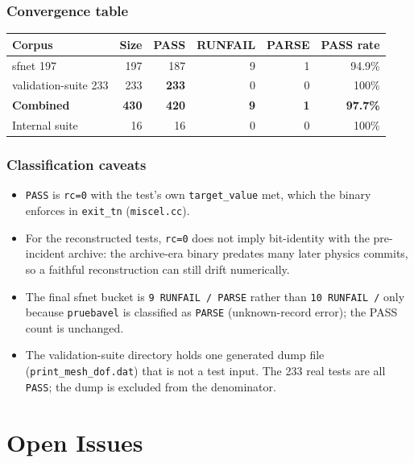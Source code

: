 \documentclass[11pt,a4paper]{report}
\newcommand{\code}[1]{\texttt{#1}}
\begin{document}
\section{Convergence table}

\begin{center}
\begin{tabular}{@{}L{4.4cm}rrrrr@{}}
\toprule
Corpus & Size & PASS & RUNFAIL & PARSE & PASS rate \\
\midrule
sfnet 197 & 197 & 187 & 9 & 1 & 94.9\% \\
validation-suite 233 & 233 & \textbf{233} & 0 & 0 & 100\% \\
\textbf{Combined} & \textbf{430} & \textbf{420} & \textbf{9} & \textbf{1} & \textbf{97.7\%} \\
Internal suite & 16 & 16 & 0 & 0 & 100\% \\
\bottomrule
\end{tabular}
\end{center}

\section{Classification caveats}

\begin{itemize}
  \item \code{PASS} is \code{rc=0} with the test's own \code{target\_\allowbreak value} met,
        which the binary enforces in \code{exit\_\allowbreak tn} (\code{miscel.cc}).
  \item For the reconstructed tests, \code{rc=0} does not imply bit-identity with
        the pre-incident archive: the archive-era binary predates many later
        physics commits, so a faithful reconstruction can still drift
        numerically.
  \item The final sfnet bucket is \code{9 RUNFAIL / PARSE} rather than
        \code{10 RUNFAIL /} only because \code{pruebavel} is classified as
        \code{PARSE} (unknown-record error); the PASS count is unchanged.
  \item The validation-suite directory holds one generated dump file
        (\code{print\_\allowbreak mesh\_\allowbreak dof.dat}) that is not a test input. The 233
        real tests are all \code{PASS}; the dump is excluded from the
        denominator.
\end{itemize}

\part{Open Issues}
\end{document}
